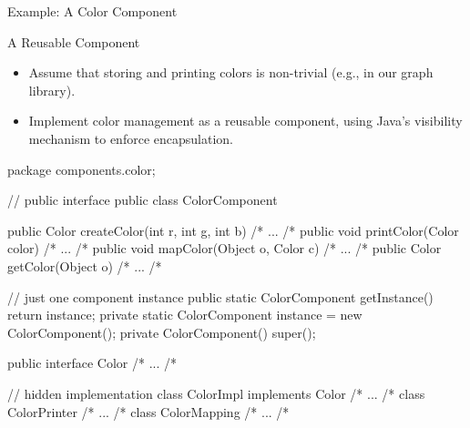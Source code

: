 \begin{frame}[fragile]{Example: A Color Component \mytitlesource{\fospl}}
	\begin{mycolumns}[columns=2,widths={40,60}]
			\begin{example}{A Reusable Component}
				\begin{itemize}
					\item Assume that storing and printing colors is non-trivial (e.g., in our graph library). 
					\item Implement color management as a reusable component, using Java's visibility mechanism to enforce encapsulation.						
				\end{itemize}
			\end{example}
		\mynextcolumn
\begin{codetight}{}
package components.color;

// public interface
public class ColorComponent {
	public Color createColor(int r, int g, int b) { /* ... /* }
	public void printColor(Color color) { /* ... /* }
	public void mapColor(Object o, Color c) { /* ... /* }
	public Color getColor(Object o) { /* ... /* }
	
	// just one component instance
	public static ColorComponent getInstance() { return instance; }
	private static ColorComponent instance = new ColorComponent();
	private ColorComponent() { super(); }
}
public interface Color { /* ... /* }

// hidden implementation
class ColorImpl implements Color { /* ... /* }
class ColorPrinter { /* ... /* }
class ColorMapping { /* ... /* }
\end{codetight} %
	\end{mycolumns}
\end{frame}

